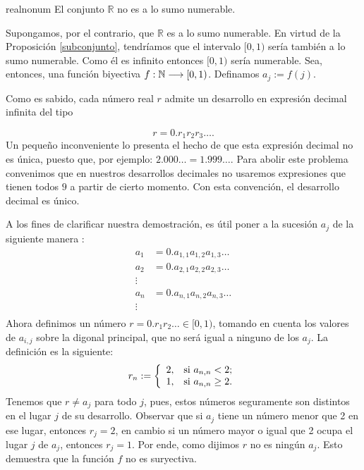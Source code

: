 \begin{teorema}{realnonum} El conjunto $\mathbb{R}$ no es
a lo sumo numerable.
\end{teorema}
\begin{demo} Supongamos, por el contrario, que $\mathbb{R}$ es a
lo sumo numerable. En virtud de la Proposición
\vref{subconjunto}, tendríamos que el intervalo $[0,1)$
sería también a lo sumo numerable. Como él es infinito
entonces $[0,1)$ sería numerable. Sea, entonces, una
función biyectiva $f:\mathbb{N}\longrightarrow [0,1)$. Definamos
$a_j:=f(j)$.

Como es sabido, cada número real $r$ admite un desarrollo en
expresión decimal infinita del tipo

\[r=0.r_1r_2r_3\dots.\]
Un peque\~no inconveniente lo presenta el hecho de que esta
expresión decimal no es única, puesto que, por ejemplo:
$2.000\dots=1.999\dots$. Para abolir este problema convenimos que
en nuestros desarrollos decimales no usaremos expresiones que
tienen todos $9$ a partir de cierto momento. Con esta
convención, el desarrollo decimal es único.

A los fines de clarificar nuestra demostración, es útil poner
a la sucesión $a_j$ de la siguiente manera :
\[\begin{split}
a_1&=0.a_{1,1}a_{1,2}a_{1,3}\dots\\
a_2&=0.a_{2,1}a_{2,2}a_{2,3}\dots\\
\vdots&\\
a_n&=0.a_{n,1}a_{n,2}a_{n,3}\dots\\
 \vdots&\\
 \end{split}\]
Ahora definimos un número $r=0.r_1r_2\dots\in[0,1)$, tomando en
cuenta los valores de $a_{i,j}$ sobre la digonal principal, que
    no será igual a ninguno de los $a_j$. La definición es la
siguiente:
\[r_n:=\left\{
\begin{array}{ll}
    2, & \hbox{si $a_{n,n}<2$;} \\
    1, & \hbox{si $a_{n,n}\geq 2$.} \\
\end{array}
\right.
\]
Tenemos que $r\neq a_j$ para todo $j$, pues, estos números
seguramente son distintos en el lugar $j$ de su desarrollo.
Observar que si $a_j$ tiene un número menor que 2 en ese lugar,
entonces $r_j=2$, en cambio si un número mayor o igual que 2
ocupa el lugar $j$ de $a_j$, entonces $r_j=1$. Por ende, como
dijimos $r$ no es ningún $a_j$. Esto demuestra que la función
$f$ no es suryectiva.
\end{demo}

